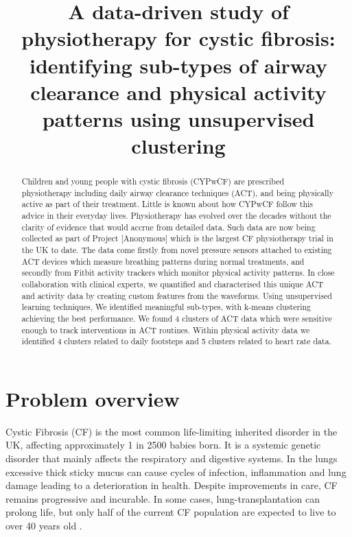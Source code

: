 \documentclass{article}
\title{A data-driven study of physiotherapy for cystic fibrosis: identifying sub-types of airway clearance and physical activity patterns using unsupervised clustering}
\begin{document}
\maketitle

\begin{abstract}
  Children and young people with cystic fibrosis (CYPwCF) are prescribed physiotherapy including daily airway clearance techniques (ACT), and being physically active as part of their treatment. Little is known about how CYPwCF follow this advice in their everyday lives. Physiotherapy has evolved over the decades without the clarity of evidence that would accrue from detailed data. Such data are now being collected as part of Project [Anonymous] which is the largest CF physiotherapy trial in the UK to date. The data come firstly from novel pressure sensors attached to existing ACT devices which measure breathing patterns during normal treatments, and secondly from Fitbit activity trackers which monitor physical activity patterns. In close collaboration with clinical experts, we quantified and characterised this unique ACT and activity data by creating custom features from the waveforms. Using unsupervised learning techniques, We identified meaningful sub-types, with k-means clustering achieving the best performance. We found 4 clusters of ACT data which were sensitive enough to track interventions in ACT routines. Within physical activity data we identified 4 clusters related to daily footsteps  and 5 clusters related to heart rate data.
\end{abstract}

\section{Problem overview}

Cystic Fibrosis (CF) is the most common life-limiting inherited disorder in the UK, affecting approximately 1 in 2500 babies born. It is a systemic genetic disorder that mainly affects the respiratory and digestive systems. In the lungs excessive thick sticky mucus can cause cycles of infection, inflammation and lung damage leading to a deterioration in health. Despite improvements in care, CF remains progressive and incurable. In some cases, lung-transplantation can prolong life, but only half of the current CF population are expected to live to over 40 years old \cite{Keogh2018}.  
\end{document}
